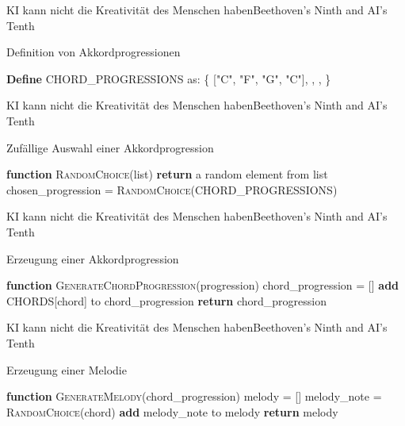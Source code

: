 \documentclass[169,9pt]{beamer}
\begin{document}
\begin{frame}{KI kann nicht die Kreativität des Menschen haben}{Beethoven's Ninth and AI's Tenth}
\begin{algorithm}[H]
    \caption{Definition von Akkordprogressionen}
    \begin{algorithmic}[1]
    \State \textbf{Define} CHORD\_PROGRESSIONS as:
    \State \{ ["C", "F", "G", "C"],
    \State ["C", "G", "Am", "F"],
    \State ["C", "Em", "F", "G"],
    \State ["Am", "F", "C", "G"] \}
    \State
    \end{algorithmic}
\end{algorithm}
\end{frame}

\begin{frame}{KI kann nicht die Kreativität des Menschen haben}{Beethoven's Ninth and AI's Tenth}
\begin{algorithm}[H]
\caption{Zufällige Auswahl einer Akkordprogression}
\begin{algorithmic}[1]
\State \textbf{function} \textsc{RandomChoice}(list)
    \State \quad \textbf{return} a random element from list
\EndFunction
\State chosen\_progression = \textsc{RandomChoice}(CHORD\_PROGRESSIONS)
\State
\end{algorithmic}
\end{algorithm}
\end{frame}

\begin{frame}{KI kann nicht die Kreativität des Menschen haben}{Beethoven's Ninth and AI's Tenth}\begin{algorithm}[H]
\caption{Erzeugung einer Akkordprogression}
\begin{algorithmic}[1]
\State \textbf{function} \textsc{GenerateChordProgression}(progression)
    \State \quad chord\_progression = []
        \State \quad \quad \textbf{add} CHORDS[chord] to chord\_progression
    \EndFor
    \State \quad \textbf{return} chord\_progression
\EndFunction
\end{algorithmic}
\end{algorithm}
\end{frame}

\begin{frame}{KI kann nicht die Kreativität des Menschen haben}{Beethoven's Ninth and AI's Tenth}\begin{algorithm}[H]
\caption{Erzeugung einer Melodie}
\begin{algorithmic}[1]
\State \textbf{function} \textsc{GenerateMelody}(chord\_progression)
    \State \quad melody = []
        \State \quad \quad melody\_note = \textsc{RandomChoice}(chord)
        \State \quad \quad \textbf{add} melody\_note to melody
    \EndFor
    \State \quad \textbf{return} melody
\EndFunction
\end{algorithmic}
\end{algorithm}
\end{frame}
\end{document}
